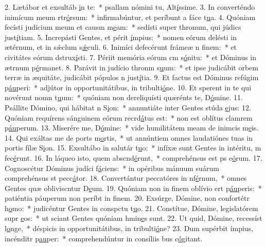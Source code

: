 2. Lætábor et exsultáb \uline{i}n te:~* psallam nómini tu, Alt\uline{í}ssime.
3. In converténdo inimícum meum rtr\uline{ó}rsum:~* infirmabúntur, et períbunt a fáce t\uline{u}a.
4. Quóniam fecísti judícium meum et causm m\uline{e}am:~* sedísti super thronum, qui júdics just\uline{í}tiam.
5. Increpásti Gentes, et périt \uline{í}mpius:~* nomen eórum delésti in ætérnum, et in sǽclum s\uline{ǽ}culi.
6. Inimíci defecérunt frámeæ n f\uline{i}nem:~* et civitátes eórum dstrux\uline{í}sti.
7. Périit memória eórum cm s\uline{ó}nitu:~* et Dóminus in ætrnum p\uline{é}rmanet.
8. Parávit in judício thronm s\uline{u}um:~* et ipse judicábit orbem terræ in æquitáte, judicábit pópulos n just\uline{í}tia.
9. Et factus est Dóminus refúgim p\uline{áu}peri:~* adjútor in opportunitátibus, in tribulti\uline{ó}ne.
10. Et sperent in te qui novérunt nomn t\uline{u}um:~* quóniam non dereliquísti quærénts te, D\uline{ó}mine.
11. Psállite Dómino, qui hábitat n S\uline{i}on:~* annuntiáte inter Gentes stúda \uline{e}jus:
12. Quóniam requírens sánguinem eórum recrd\uline{á}tus est:~* non est oblítus clamrem p\uline{áu}perum.
13. Miserére me, D\uline{ó}mine:~* vide humilitátem meam de inimcis m\uline{e}is.
14. Qui exáltas me de ports m\uline{o}rtis,~* ut annúntiem omnes laudatiónes tuas in portis fílæ S\uline{i}on.
15. Exsultábo in salutár t\uline{u}o:~* infíxæ sunt Gentes in intéritu, m fec\uline{é}runt.
16. In láqueo isto, quem abscnd\uline{é}runt,~* comprehénsus est ps e\uline{ó}rum.
17. Cognoscétur Dóminus judíci f\uline{á}ciens:~* in opéribus mánuum suárum comprehénsus st pecc\uline{á}tor.
18. Convertántur peccatóres in nf\uline{é}rnum,~* omnes Gentes quæ obliviscntur D\uline{e}um.
19. Quóniam non in finem oblívio ert p\uline{áu}peris:~* patiéntia páuperum non períbt in f\uline{i}nem.
20. Exsúrge, Dómine, non confortétr h\uline{o}mo:~* judicéntur Gentes in conspctu t\uline{u}o.
21. Constítue, Dómine, legislatórem supr \uline{e}os:~* ut sciant Gentes quóniam hmin\uline{e}s sunt.
22. Ut quid, Dómine, recessíst l\uline{o}nge,~* déspicis in opportunitátibus, in tribulti\uline{ó}ne?
23. Dum supérbit ímpius, incénditr p\uline{au}per:~* comprehendúntur in consíliis bus c\uline{ó}gitant.
